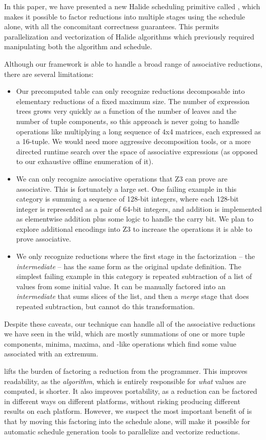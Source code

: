 In this paper, we have presented a new Halide scheduling primitive called , which makes it possible to factor reductions into multiple stages using the schedule alone, with all the concomitant correctness guarantees. This permits parallelization and vectorization of Halide algorithms which previously required manipulating both the algorithm and schedule.

Although our framework is able to handle a broad range of associative reductions, there are several limitations:

\begin{itemize}
\item Our precomputed table can only recognize reductions decomposable into elementary reductions of a fixed maximum size. The number of expression trees grows very quickly as a function of the number of leaves and the number of tuple components, so this approach is never going to handle operations like multiplying a long sequence of 4x4 matrices, each expressed as a 16-tuple. We would need more aggressive decomposition tools, or a more directed runtime search over the space of associative expressions (as opposed to our exhaustive offline enumeration of it).
\item We can only recognize associative operations that Z3 can prove are associative. This is fortunately a large set. One failing example in this category is summing a sequence of 128-bit integers, where each 128-bit integer is represented as a pair of 64-bit integers, and addition is implemented as elementwise addition plus some logic to handle the carry bit.  We plan to explore additional encodings into Z3 to increase the operations it is able to prove associative.
\item We only recognize reductions where the first stage in the factorization -- the \emph{intermediate} -- has the same form as the original update definition. The simplest failing example in this category is repeated subtraction of a list of values from some initial value. It can be manually factored into an \emph{intermediate} that sums slices of the list, and then a \emph{merge} stage that does repeated subtraction, but  cannot do this transformation.
\end{itemize}

Despite these caveats, our technique can handle all of the associative reductions we have seen in the wild, which are mostly summations of one or more tuple components, minima, maxima, and -like operations which find some value associated with an extremum.

 lifts the burden of factoring a reduction from the programmer. This improves readability, as the \emph{algorithm}, which is entirely responsible for \emph{what} values are computed, is shorter. It also improves portability, as a reduction can be factored in different ways on different platforms, without risking producing different results on each platform. However, we suspect the most important benefit of  is that by moving this factoring into the schedule alone,  will make it possible for automatic schedule generation tools to parallelize and vectorize reductions.
